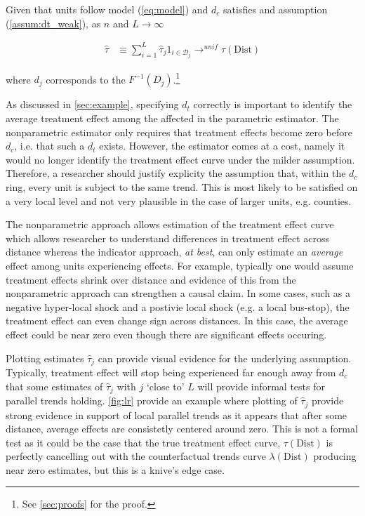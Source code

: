 \documentclass[12pt]{article}
\newcommand{\dist}{\text{Dist}}
\begin{document}
\begin{proposition}\label{prop:np_identification}  
    Given that units follow model (\ref{eq:model}) and $d_c$ satisfies  and assumption (\ref{assum:dt_weak}), as $n$ and $L \to \infty$ 

    \begin{align*}
        \hat{\tau} &\equiv \sum_{i=1}^L \hat{\tau}_j 1_{i \in \mathcal{D}_j} \to^{unif} \tau(\dist)
    \end{align*}

    where $d_j$ corresponds to the $F^{-1}(D_j)$.\footnote{See \autoref{sec:proofs} for the proof.}
\end{proposition}

As discussed in \autoref{sec:example}, specifying $d_t$ correctly is important to identify the average treatment effect among the affected in the parametric estimator. The nonparametric estimator only requires that treatment effects become zero before $d_c$, i.e. that such a $d_t$ exists. However, the estimator comes at a cost, namely it would no longer identify the treatment effect curve under the milder  assumption. Therefore, a researcher should justify explicity the assumption that, within the $d_c$ ring, every unit is subject to the same trend. This is most likely to be satisfied on a very local level and not very plausible in the case of larger units, e.g. counties.

The nonparametric approach allows estimation of the treatment effect curve which allows researcher to understand differences in treatment effect across distance whereas the indicator approach, \emph{at best}, can only estimate an \emph{average} effect among units experiencing effects. For example, typically one would assume treatment effects shrink over distance and evidence of this from the nonparametric approach can strengthen a causal claim. In some cases, such as a negative hyper-local shock and a postivie local shock (e.g. a local bus-stop), the treatment effect can even change sign across distances. In this case, the average effect could be near zero even though there are significant effects occuring. 

Plotting estimates $\hat{\tau}_j$ can provide visual evidence for the underlying  assumption. Typically, treatment effect will stop being experienced far enough away from $d_c$ that some estimates of $\hat{\tau}_j$ with $j$ `close to' $L$ will provide informal tests for parallel trends holding. \autoref{fig:lr} provide an example where plotting of $\hat{\tau}_j$ provide strong evidence in support of local parallel trends as it appears that after some distance, average effects are consistetly centered around zero. This is not a formal test as it could be the case that the true treatment effect curve, $\tau(\dist)$ is perfectly cancelling out with the counterfactual trends curve $\lambda(\dist)$ producing near zero estimates, but this is a knive's edge case. 
\end{document}
